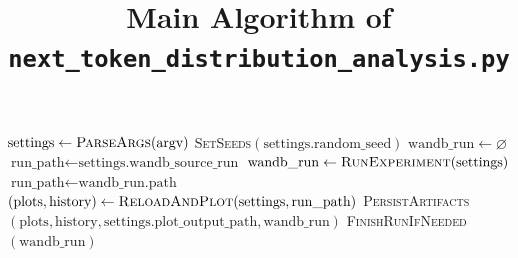\documentclass{article}
\title{Main Algorithm of \texttt{next\_token\_distribution\_analysis.py}}
\author{}
\date{}
\begin{document}
\maketitle

\begin{algorithm}
\caption{Top-Level Control Flow}
\begin{algorithmic}[1]
\STATE $\text{settings} \leftarrow \textsc{ParseArgs}(\text{argv})$
\STATE \textsc{SetSeeds}$(\text{settings.random\_seed})$
\STATE $\text{wandb\_run} \leftarrow \varnothing$
\STATE $\text{run\_path} \leftarrow \text{settings.wandb\_source\_run}$
    \STATE $\text{wandb\_run} \leftarrow \textsc{RunExperiment}(\text{settings})$
        \STATE $\text{run\_path} \leftarrow \text{wandb\_run.path}$
    \ENDIF
\ENDIF
{}
    \STATE $(\text{plots}, \text{history}) \leftarrow \textsc{ReloadAndPlot}(\text{settings}, \text{run\_path})$
    \STATE \textsc{PersistArtifacts}$(\text{plots}, \text{history}, \text{settings.plot\_output\_path}, \text{wandb\_run})$
\ENDIF
\STATE \textsc{FinishRunIfNeeded}$(\text{wandb\_run})$
\end{algorithmic}
\end{algorithm}
\end{document}
